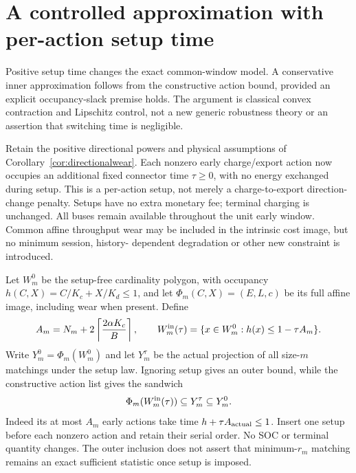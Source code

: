 \section{A controlled approximation with per-action setup time}
\label{app:setuptime}
Positive setup time changes the exact common-window model. A conservative
inner approximation follows from the constructive action bound, provided
an explicit occupancy-slack premise holds. The argument is classical
convex contraction and Lipschitz control, not a new generic robustness
theory or an assertion that switching time is negligible.

Retain the positive directional powers and physical assumptions of
Corollary~\ref{cor:directionalwear}. Each nonzero early charge/export
action now occupies an additional fixed connector time $\tau\ge0$,
with no energy exchanged during setup. This is a per-action setup, not
merely a charge-to-export direction-change penalty. Setups have no extra
monetary fee; terminal charging is unchanged. All buses remain available
throughout the unit early window. Common affine throughput wear may be
included in the intrinsic cost image, but no minimum session, history-
dependent degradation or other new constraint is introduced.

Let $W_m^0$ be the setup-free cardinality polygon, with occupancy
$h(C,X)=C/K_c+X/K_d\le1$, and let $\Phi_m(C,X)=(E,L,c)$ be its full
affine image, including wear when present. Define
\[
 A_m=N_m+2\left\lceil\frac{2\alpha K_c}{B}\right\rceil,
 \qquad
 W_m^{\rm in}(\tau)=
 \{x\in W_m^0:h(x)\le1-\tau A_m\}.
\]
Write $Y_m^0=\Phi_m(W_m^0)$ and let $Y_m^\tau$ be the actual projection
of all size-$m$ matchings under the setup law. Ignoring setup gives an
outer bound, while the constructive action list gives the sandwich
\begin{equation}\label{eq:setupsandwich}
 \Phi_m(W_m^{\rm in}(\tau))\subseteq Y_m^\tau\subseteq Y_m^0.
\end{equation}
Indeed its at most $A_m$ early actions take time $h+\tau A_{\rm actual}
\le1$. Insert one setup before each nonzero action and retain their
serial order. No SOC or terminal quantity changes. The outer inclusion
does not assert that minimum-$r_m$ matching remains an exact sufficient
statistic once setup is imposed.

